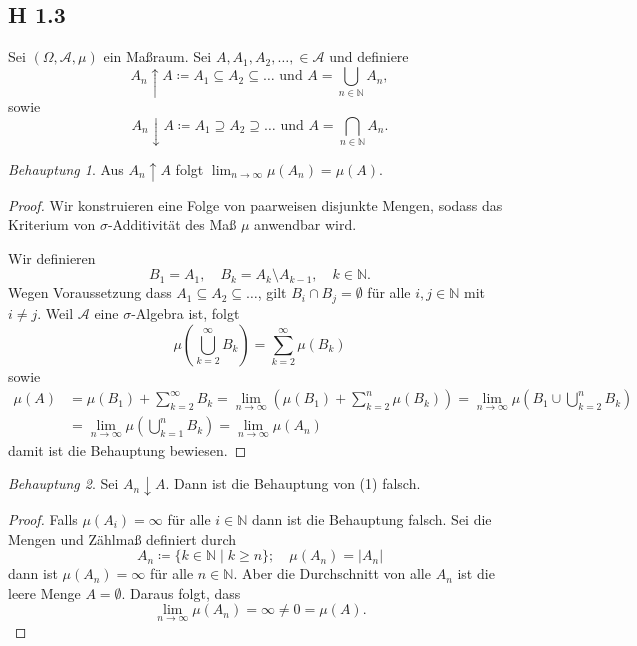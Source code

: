\documentclass[draft,a5paper]{article}
\providecommand{\abs}[1]{\left\lvert#1\right\rvert}
\theoremstyle{remark}
\newtheorem*{Behauptung}{Behauptung}
\begin{document}
\subsection{H 1.3}
Sei \((\Omega, \mathcal{A}, \mu)\) ein Maßraum.  Sei \(A, A_{1}, A_{2}, \ldots, \in \mathcal{A}\) und
definiere
\[ A_{n} \uparrow A \coloneq A_{1} \subseteq A_{2} \subseteq \ldots \text{ und } A = \bigcup_{n \in \mathbb{N}}{A_{n}},\]
sowie
\[ A_{n} \downarrow A \coloneq A_{1} \supseteq A_{2} \supseteq \ldots \text{ und } A = \bigcap_{n \in \mathbb{N}}{A_{n}}.\]
\begin{Behauptung}
  Aus \(A_{n} \uparrow A\) folgt \(\lim_{n \to \infty}{\mu(A_{n})} = \mu(A)\).
\end{Behauptung}
\begin{proof}
Wir konstruieren eine Folge von paarweisen disjunkte Mengen, sodass
das Kriterium von \(\sigma\)-Additivität des Maß \(\mu\) anwendbar wird.

Wir definieren
\[ B_{1} = A_{1}, \quad B_{k} = A_{k} \setminus A_{k - 1}, \quad k \in \mathbb{N}.\]
Wegen Voraussetzung dass \(A_{1} \subseteq A_{2} \subseteq \ldots\), gilt \(B_{i} \cap B_{j} = \emptyset
\) für alle \(i, j \in \mathbb{N}\) mit \(i \ne j\).  Weil \(\mathcal{A}\) eine \(\sigma\)-Algebra ist,
folgt
\[\mu\left(\bigcup_{k = 2}^{\infty}{B_{k}}\right) = \sum_{k = 2}^{\infty}{\mu(B_{k})}\]
sowie
\begin{align*}
  \mu(A) &= \mu(B_{1}) + \sum_{k = 2}^{\infty}{B_{k}}
       = \lim_{n \to \infty}\left(\mu(B_{1}) + \sum_{k=2}^{n}{\mu(B_{k})}\right)
       = \lim_{n \to \infty}\mu\left(B_{1} \cup \bigcup_{k = 2}^{n}{B_{k}}\right) \\
       &= \lim_{n \to \infty}\mu\left({\bigcup_{k =1}^{n}B_{k}}\right)
         = \lim_{n \to \infty}{\mu(A_{n})} \tag*{:wegen Def von \(B\)}
\end{align*}
damit ist die Behauptung bewiesen.
\end{proof}
\begin{Behauptung}
  Sei \(A_{n} \downarrow A\).  Dann ist die Behauptung von (1) falsch.
\end{Behauptung}
\begin{proof}
  Falls \(\mu(A_{i}) = \infty\) für alle \(i \in \mathbb{N}\) dann ist die Behauptung
  falsch.  Sei die Mengen und Zählmaß definiert durch
  \[A_{n} \coloneq \{k \in \mathbb{N} \mid k \ge n\}; \quad \mu(A_{n}) = \abs{A_{n}}\]
  dann ist \(\mu(A_{n}) = \infty\) für alle \(n \in \mathbb{N}\).  Aber die Durchschnitt von
  alle \(A_{n}\) ist die leere Menge \(A = \emptyset\).  Daraus folgt, dass
  \[\lim_{n \to \infty}{\mu(A_{n})} = \infty \ne 0 = \mu(A).\]
\end{proof}
\newpage
\end{document}
